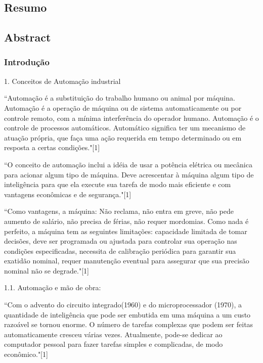 \documentclass[a4paper, 12pt]{article}
\begin{document}
\begin{center}
\part*{Resumo}
\end{center}

\begin{center}
\part*{Abstract}
\end{center}

\section{Introdução}
1. Conceitos de Automação industrial

``Automação é a substituição do trabalho humano ou animal por máquina.
Automação é a operação de máquina ou de sistema automaticamente ou por
controle remoto, com a mínima interferência do operador humano.
Automação é o controle de processos automáticos. Automático significa ter
um mecanismo de atuação própria, que faça uma ação requerida em tempo 
determinado ou em resposta a certas condições."[1]

``O conceito de automação inclui a idéia de usar a potência elétrica ou 
mecânica para acionar algum tipo de máquina. Deve acrescentar à máquina
algum tipo de inteligência para que ela execute sua tarefa de modo mais
eficiente e com vantagens econômicas e de segurança."[1]

``Como vantagens, a máquina: Não reclama, não entra em greve, não pede 
aumento de salário, não precisa de férias, não requer mordomias.
Como nada é perfeito, a máquina tem as seguintes limitações: capacidade 
limitada de tomar decisões, deve ser programada ou ajustada para controlar
sua operação nas condições especificadas, necessita de calibração periódica
para garantir sua exatidão nominal, requer manutenção eventual para assegurar
que sua precisão nominal não se degrade."[1]

1.1. Automação e mão de obra:

``Com o advento do circuito integrado(1960) e do microprocessador (1970), a
quantidade de inteligência que pode ser embutida em uma máquina a um custo
razoável se tornou enorme. O número de tarefas complexas que podem ser feitas
automaticamente cresceu várias vezes. Atualmente, pode-se dedicar ao computador
pessoal para fazer tarefas simples e complicadas, de modo econômico."[1]
\end{document}
